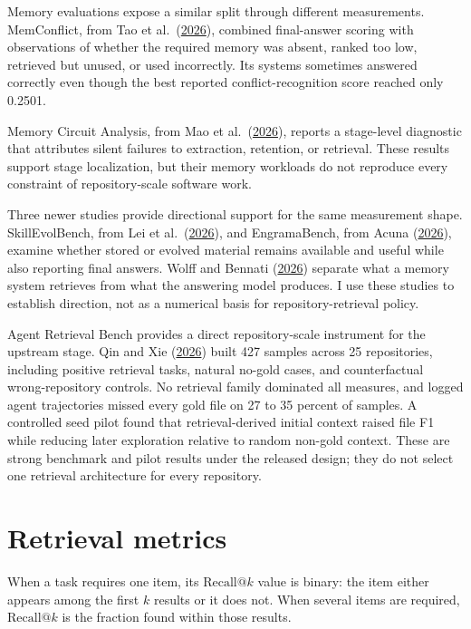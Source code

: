 Memory evaluations expose a similar split through different measurements. MemConflict, from Tao et al.~(\href{https://arxiv.org/abs/2605.20926}{2026}), combined final-answer scoring with observations of whether the required memory was absent, ranked too low, retrieved but unused, or used incorrectly. Its systems sometimes answered correctly even though the best reported conflict-recognition score reached only 0.2501.

Memory Circuit Analysis, from Mao et al.~(\href{https://arxiv.org/abs/2605.03354}{2026}), reports a stage-level diagnostic that attributes silent failures to extraction, retention, or retrieval. These results support stage localization, but their memory workloads do not reproduce every constraint of repository-scale software work.

Three newer studies provide directional support for the same measurement shape. SkillEvolBench, from Lei et al.~(\href{https://arxiv.org/abs/2605.24117}{2026}), and EngramaBench, from Acuna (\href{https://arxiv.org/abs/2604.21229}{2026}), examine whether stored or evolved material remains available and useful while also reporting final answers. Wolff and Bennati (\href{https://arxiv.org/abs/2601.07978}{2026}) separate what a memory system retrieves from what the answering model produces. I use these studies to establish direction, not as a numerical basis for repository-retrieval policy.

Agent Retrieval Bench provides a direct repository-scale instrument for the upstream stage. Qin and Xie (\href{https://arxiv.org/abs/2607.24882}{2026}) built 427 samples across 25 repositories, including positive retrieval tasks, natural no-gold cases, and counterfactual wrong-repository controls. No retrieval family dominated all measures, and logged agent trajectories missed every gold file on 27 to 35 percent of samples. A controlled seed pilot found that retrieval-derived initial context raised file F1 while reducing later exploration relative to random non-gold context. These are strong benchmark and pilot results under the released design; they do not select one retrieval architecture for every repository.

\hypertarget{retrieval-metrics}{%
\section{Retrieval metrics}\label{retrieval-metrics}}

When a task requires one item, its \(\mathrm{Recall}@k\) value is binary: the item either appears among the first \(k\) results or it does not. When several items are required, \(\mathrm{Recall}@k\) is the fraction found within those results.

